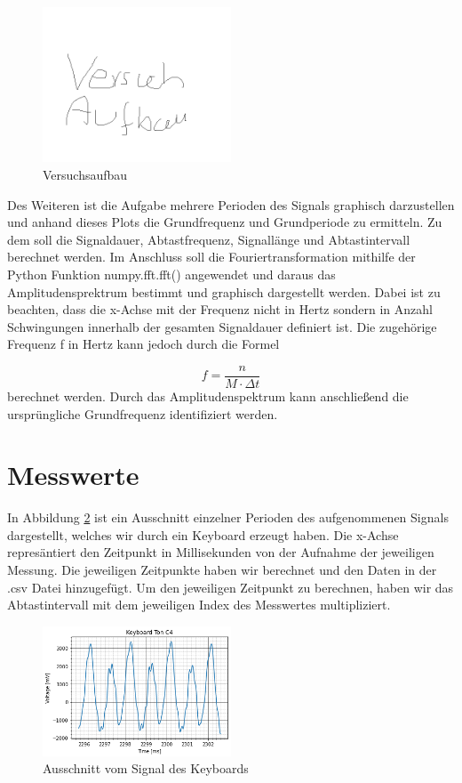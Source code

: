 \documentclass[12pt, oneside, a4paper, \docLanguage]{report}
\begin{document}
\begin{figure}[H]
	\centering\small
	\includegraphics[width=0.5\textwidth]{media/Versuchsaufbau.png}
	\caption{Versuchsaufbau}
	\label{fig:VERSUCH_1_VERSUCHSAUFBAU}
\end{figure}

Des Weiteren ist die Aufgabe mehrere Perioden des Signals graphisch darzustellen und anhand dieses Plots die Grundfrequenz und Grundperiode zu ermitteln. Zu dem soll die Signaldauer, Abtastfrequenz, Signallänge und Abtastintervall berechnet werden.
Im Anschluss soll die Fouriertransformation mithilfe der Python Funktion numpy.fft.fft() angewendet und daraus das Amplitudensprektrum bestimmt und graphisch dargestellt werden. Dabei ist zu beachten, dass die x-Achse mit der Frequenz nicht in Hertz sondern in Anzahl Schwingungen innerhalb der gesamten Signaldauer definiert ist. Die zugehörige Frequenz f in Hertz kann jedoch durch die Formel 

\begin{equation*}
	f = \frac{n}{M \cdot \Delta t}
\end{equation*}
berechnet werden. Durch das Amplitudenspektrum kann anschließend die ursprüngliche Grundfrequenz identifiziert werden.
\newpage
\section{Messwerte}
\label{chap:VERSUCH_1_MESSWERTE}
In Abbildung \ref{fig:VERSUCH_1_PERIODEN} ist ein Ausschnitt einzelner Perioden des aufgenommenen Signals dargestellt, welches wir durch ein Keyboard erzeugt haben. Die x-Achse represäntiert den Zeitpunkt in Millisekunden von der Aufnahme der jeweiligen Messung. Die jeweiligen Zeitpunkte haben wir berechnet und den Daten in der .csv Datei hinzugefügt.
Um den jeweiligen Zeitpunkt zu berechnen, haben wir das Abtastintervall mit dem jeweiligen Index des Messwertes multipliziert.

\begin{figure}[H]
	\centering\small
	\includegraphics[width=0.5\textwidth]{media/plotDecodedRichtig.png}
	\caption{Ausschnitt vom Signal des Keyboards}
	\label{fig:VERSUCH_1_PERIODEN}
\end{figure}
\end{document}
